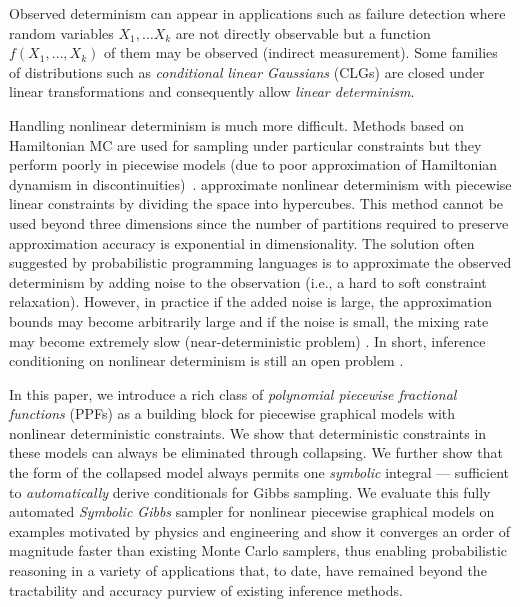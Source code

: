 \documentclass{article} %
\begin{document}
Observed determinism can appear in applications such as failure detection \cite{huseby2004system} where random variables $X_1, \ldots X_k$ are not directly observable but a function $f(X_1, \ldots, X_k)$ of them may be observed (indirect measurement). 
Some families of distributions such as \emph{conditional linear Gaussians} (CLGs) 
\cite{lauritzen2001stable}
are closed under linear transformations and consequently allow \emph{linear determinism}.
\nocite{li2013dynamic}

Handling nonlinear determinism is much more difficult. Methods based on
Hamiltonian MC are used for sampling under particular constraints
\cite{hartmann2008ergodic} but they perform poorly in piecewise models
(due to poor approximation of Hamiltonian dynamism in
discontinuities)~\cite{neal2011mcmc}.  \cite{cobb2005nonlinear}
approximate nonlinear determinism with piecewise linear constraints
by dividing the space into hypercubes. This method cannot be used beyond
three dimensions since the number of partitions required
to preserve approximation accuracy is exponential in dimensionality.
The solution often suggested by probabilistic programming languages is
to approximate the observed determinism by adding noise to the
observation (i.e., a hard to soft constraint relaxation).
However, in practice if the added noise is large, the approximation
bounds may become arbitrarily large and if the noise is small, the
mixing rate may become extremely slow (near-deterministic problem)
\cite{chin1987bayesian}.  In short, inference conditioning on nonlinear
determinism is still an open problem \cite{li2013dynamic}.

In this paper, we introduce a rich class of \emph{polynomial piecewise
  fractional functions} (PPFs) as a building block for piecewise
graphical models with nonlinear deterministic constraints.  We show
that deterministic constraints in these models can always be
eliminated through collapsing.  We further show that the form of the
collapsed model always permits one \emph{symbolic} integral ---
sufficient to \emph{automatically} derive conditionals for Gibbs
sampling.  We evaluate this fully automated \emph{Symbolic Gibbs} sampler for
nonlinear piecewise graphical models on examples motivated by physics
and engineering and show it converges an order of magnitude faster
than existing Monte Carlo samplers, thus enabling probabilistic reasoning in a
variety of applications that, to date, have remained beyond the
tractability and accuracy purview of existing inference methods.
\end{document}
